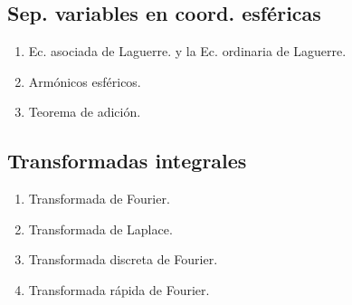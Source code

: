 \subsection{Sep. variables en coord. esféricas}

\begin{enumerate}[label=4.5.\arabic*]
\item Ec. asociada de Laguerre. y la Ec. ordinaria de Laguerre.
\item Armónicos esféricos.
\item Teorema de adición.
\end{enumerate}

\subsection{Transformadas integrales}

\begin{enumerate}[label=4.6.\arabic*]
\item Transformada de Fourier.
\item Transformada de Laplace.
\item Transformada discreta de Fourier.
\item Transformada rápida de Fourier.
\end{enumerate}

